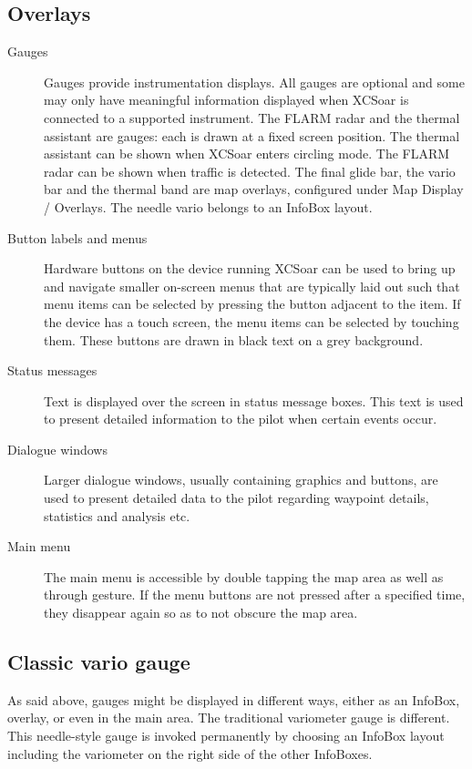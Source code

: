 \subsection*{Overlays}
\begin{description}
\item[Gauges]  Gauges provide instrumentation displays. All gauges are optional
and some may only have meaningful information displayed when XCSoar is
connected to a supported instrument.
The FLARM radar and the thermal assistant are gauges: each is drawn at a
fixed screen position. The thermal assistant can be shown when XCSoar
enters circling mode. The FLARM radar can be shown when traffic is
detected. The final glide bar, the vario bar and the thermal band are
map overlays, configured under Map Display / Overlays. The needle vario
belongs to an InfoBox layout.
\item[Button labels and menus] Hardware buttons on the device running XCSoar
can be used to bring up and navigate smaller on-screen menus that are
typically laid out such that menu items can be selected by pressing the
button adjacent to the item.  If the device has a touch screen, the menu
items can be selected by touching them.  These buttons are drawn in black
text on a grey background.
\item[Status messages] Text is displayed over the screen in status message
boxes.  This text is used to present detailed information to the pilot when
certain events occur.
\item[Dialogue windows] Larger dialogue windows, usually containing graphics and
buttons, are used to present detailed data to the pilot regarding waypoint
details, statistics and analysis etc.
\item[Main menu] The main menu is accessible by double tapping the map area
as well as through gesture. If the menu buttons are not pressed after
 a specified time, they disappear again so as to not obscure 
the map area.
\end{description}

\subsection*{Classic vario gauge}
As said above, gauges might be displayed in different ways, either as an 
InfoBox, overlay, or even in the main area. The traditional variometer gauge is
different. This needle-style gauge is invoked permanently by choosing an InfoBox
layout including the variometer on the right side of the other InfoBoxes.

